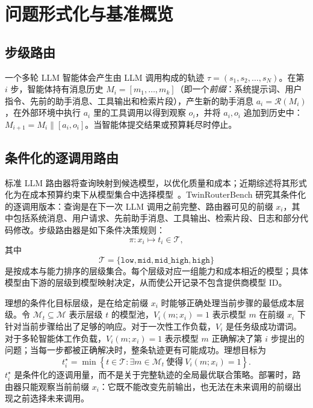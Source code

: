 \section{问题形式化与基准概览}
\label{sec:benchmark-overview}

\subsection{步级路由}

一个多轮 LLM 智能体会产生由 LLM 调用构成的轨迹 $\tau = (s_1, s_2, \ldots, s_N)$。在第 $i$ 步，智能体持有消息历史 $M_i = [m_1, \ldots, m_k]$（即一个\emph{前缀}：系统提示词、用户指令、先前的助手消息、工具输出和检索片段），产生新的助手消息 $a_i = \mathcal{R}(M_i)$，在外部环境中执行 $a_i$ 里的工具调用以得到观察 $o_i$，并将 $a_i, o_i$ 追加到历史中：$M_{i+1} = M_i \parallel [a_i, o_i]$。当智能体提交结果或预算耗尽时停止。

\subsection{条件化的逐调用路由}
\label{sec:conditional-per-call-routing}

标准 LLM 路由器将查询映射到候选模型，以优化质量和成本；近期综述将其形式化为在成本预算约束下从模型集合中选择模型~\citep{varangotreille2025doing}。TwinRouterBench 研究其条件化的逐调用版本：查询是在下一次 LLM 调用之前完整、路由器可见的前缀 $x_i$，其中包括系统消息、用户请求、先前助手消息、工具输出、检索片段、日志和部分代码修改。步级路由器是如下条件决策规则：
\[
\pi : x_i \mapsto t_i \in \mathcal T,
\]
其中
\[
\mathcal T =
\{\texttt{low},\texttt{mid},\texttt{mid\_high},\texttt{high}\}
\]
是按成本与能力排序的层级集合。每个层级对应一组能力和成本相近的模型；具体模型由下游的层级到模型映射决定，从而使公开记录不包含提供商模型 ID。

理想的条件化目标层级，是在给定前缀 $x_i$ 时能够正确处理当前步骤的最低成本层级。令 $\mathcal M_t\subseteq\mathcal M$ 表示层级 $t$ 的模型池，$V_i(m;x_i)=1$ 表示模型 $m$ 在前缀 $x_i$ 下针对当前步骤给出了足够的响应。对于一次性工作负载，$V_i$ 是任务级成功谓词。对于多轮智能体工作负载，$V_i(m;x_i)=1$ 表示模型 $m$ 正确解决了第 $i$ 步提出的问题；当每一步都被正确解决时，整条轨迹更有可能成功。理想目标为
\[
t_i^\star
=
\min\left\{
t\in\mathcal T:
\exists m\in\mathcal M_t
\ \text{使得}\
V_i(m;x_i)=1
\right\}.
\]
$t_i^\star$ 是条件化的逐调用量，而不是关于完整轨迹的全局最优联合策略。部署时，路由器只能观察当前前缀 $x_i$：它既不能改变先前输出，也无法在未来调用的前缀出现之前选择未来调用。

